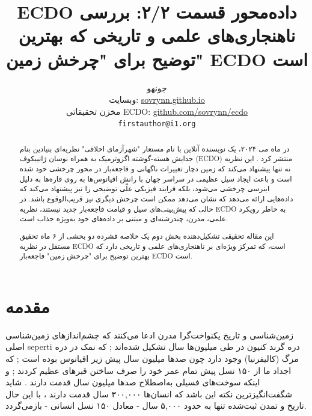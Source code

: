 \documentclass[10pt,twocolumn,letterpaper]{article}
\begin{document}
\title{ECDO داده‌محور قسمت ۲/۲: بررسی ناهنجاری‌های علمی و تاریخی که بهترین توضیح برای "چرخش زمین" ECDO است}

\author{جونهو\\
وبسایت: \href{https://sovrynn.github.io}{sovrynn.github.io}\\
مخزن تحقیقاتی ECDO: \href{https://github.com/sovrynn/ecdo}{github.com/sovrynn/ecdo}\\
{\tt\small firstauthor@i1.org}
}

\maketitle

\begin{abstract}
در ماه می ۲۰۲۴، یک نویسنده آنلاین با نام مستعار "شهرآزمای اخلاقی" \cite{0} نظریه‌ای بنیادین بنام جدایش هسته-گوشته اگزوترمیک به همراه نوسان ژانیبکوف (ECDO) منتشر کرد \cite{1}. این نظریه نه تنها پیشنهاد می‌کند که زمین دچار تغییرات ناگهانی و فاجعه‌بار در محور چرخشی خود شده است و باعث ایجاد سیل عظیمی در سراسر جهان با رانش اقیانوس‌ها به روی قاره‌ها به دلیل اینرسی چرخشی می‌شود، بلکه فرایند فیزیکی علّی توضیحی را نیز پیشنهاد می‌کند که داده‌هایی ارائه می‌دهد که نشان می‌دهد ممکن است چرخش دیگری نیز قریب‌الوقوع باشد. در حالی که پیش‌بینی‌های سیل و قیامت فاجعه‌بار جدید نیستند، نظریه ECDO به خاطر رویکرد علمی، مدرن، چند‌رشته‌ای و مبتنی بر داده‌های خود به‌ویژه جذاب است.

این مقاله تحقیقی تشکیل‌دهنده بخش دوم یک خلاصه فشرده دو بخشی از ۶ ماه تحقیق مستقل \cite{2,20} در نظریه ECDO است، که تمرکز ویژه‌ای بر ناهنجاری‌های علمی و تاریخی دارد که بهترین توضیح برای "چرخش زمین" فاجعه‌بار ECDO است.

\end{abstract}


\section{مقدمه}

زمین‌شناسی و تاریخ یکنواخت‌گرا مدرن ادعا می‌کنند که چشم‌اندازهای زمین‌شناسی اصلی seperti دره گرند کنیون در طی میلیون‌ها سال تشکیل شده‌اند \cite{143}; که نمک در دره مرگ (کالیفرنیا) وجود دارد چون صدها میلیون سال پیش زیر اقیانوس بوده است \cite{144}; که اجداد ما از ۱۵۰ نسل پیش تمام عمر خود را صرف ساختن قبرهای عظیم کردند \cite{29,70}; و اینکه سوخت‌های فسیلی به‌اصطلاح صدها میلیون سال قدمت دارند \cite{104}. شاید شگفت‌انگیزترین نکته این باشد که انسان‌ها ۳۰۰,۰۰۰ سال قدمت دارند \cite{145}، با این حال تاریخ و تمدن ثبت‌شده تنها به حدود ۵,۰۰۰ سال - معادل ۱۵۰ نسل انسانی - بازمی‌گردد.
\end{document}
